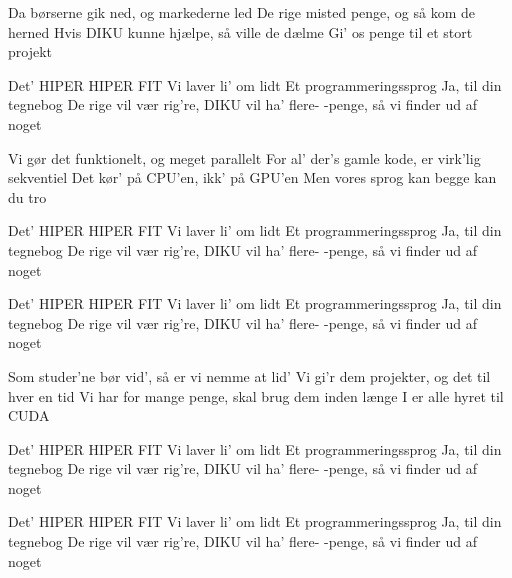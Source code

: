 \documentclass[a4paper,11pt]{article}
\begin{document}
\begin{song}
  Da børserne gik ned, og markederne led
  De rige misted penge, og så kom de herned
  Hvis DIKU kunne hjælpe, så ville de dælme
  Gi' os penge til et stort projekt

  Det' HIPER HIPER FIT
  Vi laver li' om lidt
  Et programmeringssprog
  Ja, til din tegnebog
  De rige vil vær rig're, DIKU vil ha' flere-
  -penge, så vi finder ud af noget

  Vi gør det funktionelt, og meget parallelt
  For al' der's gamle kode, er virk'lig sekventiel
  Det kør' på CPU'en, ikk' på GPU'en
  Men vores sprog kan begge kan du tro

  Det' HIPER HIPER FIT
  Vi laver li' om lidt
  Et programmeringssprog
  Ja, til din tegnebog
  De rige vil vær rig're, DIKU vil ha' flere-
  -penge, så vi finder ud af noget

  Det' HIPER HIPER FIT
  Vi laver li' om lidt
  Et programmeringssprog
  Ja, til din tegnebog
  De rige vil vær rig're, DIKU vil ha' flere-
  -penge, så vi finder ud af noget

  Som studer'ne bør vid', så er vi nemme at lid'
  Vi gi'r dem projekter, og det til hver en tid
  Vi har for mange penge, skal brug dem inden længe
  I er alle hyret til CUDA

  Det' HIPER HIPER FIT
  Vi laver li' om lidt
  Et programmeringssprog
  Ja, til din tegnebog
  De rige vil vær rig're, DIKU vil ha' flere-
  -penge, så vi finder ud af noget

  Det' HIPER HIPER FIT
  Vi laver li' om lidt
  Et programmeringssprog
  Ja, til din tegnebog
  De rige vil vær rig're, DIKU vil ha' flere-
  -penge, så vi finder ud af noget
\end{song}
\end{document}

